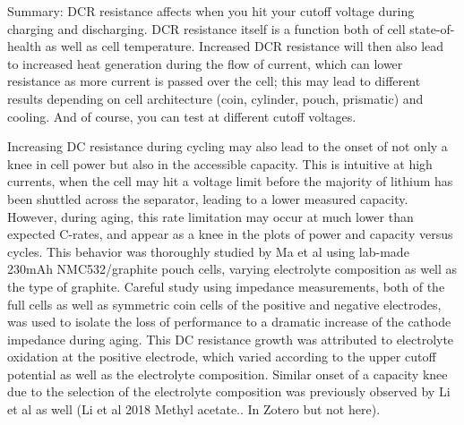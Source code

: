 \documentclass{article}
\begin{document}
Summary: DCR resistance affects when you hit your cutoff voltage during charging and discharging. DCR resistance itself is a function both of cell state-of-health as well as cell temperature. Increased DCR resistance will then also lead to increased heat generation during the flow of current, which can lower resistance as more current is passed over the cell; this may lead to different results depending on cell architecture (coin, cylinder, pouch, prismatic) and cooling. And of course, you can test at different cutoff voltages.

Increasing DC resistance during cycling may also lead to the onset of not only a knee in cell power but also in the accessible capacity. This is intuitive at high currents, when the cell may hit a voltage limit before the majority of lithium has been shuttled across the separator, leading to a lower measured capacity. However, during aging, this rate limitation may occur at much lower than expected C-rates, and appear as a knee in the plots of power and capacity versus cycles. This behavior was thoroughly studied by Ma et al \cite{ma_editors_2019} using lab-made 230mAh NMC532/graphite pouch cells, varying electrolyte composition as well as the type of graphite. Careful study using impedance measurements, both of the full cells as well as symmetric coin cells of the positive and negative electrodes, was used to isolate the loss of performance to a dramatic increase of the cathode impedance during aging. This DC resistance growth was attributed to electrolyte oxidation at the positive electrode, which varied according to the upper cutoff potential as well as the electrolyte composition. Similar onset of a capacity knee due to the selection of the electrolyte composition was previously observed by Li et al as well (Li et al 2018 Methyl acetate.. In Zotero but not here). 
\end{document}
